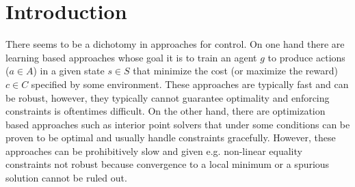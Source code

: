 \section{Introduction}
% 
% 
% 
% 
There seems to be a dichotomy in approaches for control. On one hand there are learning based approaches whose goal it is to train an agent $g$ to produce actions ($a \in A$) in a given state $s \in S$ that minimize the cost (or maximize the reward) $c \in C$ specified by some environment. These approaches are typically fast and can be robust, however, they typically cannot guarantee optimality and enforcing constraints is oftentimes difficult. On the other hand, there are optimization based approaches such as interior point solvers that under some conditions can be proven to be optimal and usually handle constraints gracefully. However, these approaches can be prohibitively slow and given e.g. non-linear equality constraints not robust because convergence to a local minimum or a spurious solution cannot be ruled out.\\
